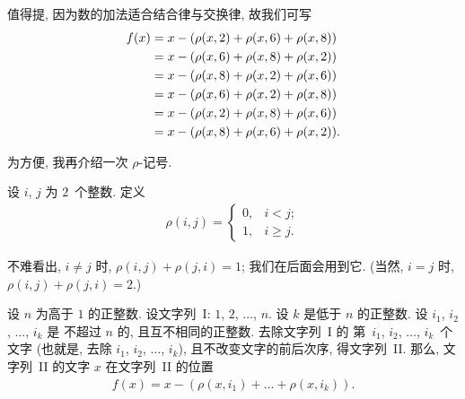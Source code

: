 \documentclass[../libro.tex]{subfiles}
\begin{document}
\begin{example}
    值得提,
    因为数的加法适合结合律与交换律,
    故我们可写
    \begin{align*}
        f(x)
        = {} & x - (\rho(x, 2) + \rho(x, 6) + \rho(x, 8))  \\
        = {} & x - (\rho(x, 6) + \rho(x, 8) + \rho(x, 2))  \\
        = {} & x - (\rho(x, 8) + \rho(x, 2) + \rho(x, 6))  \\
        = {} & x - (\rho(x, 6) + \rho(x, 2) + \rho(x, 8))  \\
        = {} & x - (\rho(x, 2) + \rho(x, 8) + \rho(x, 6))  \\
        = {} & x - (\rho(x, 8) + \rho(x, 6) + \rho(x, 2)).
        \qedhere
    \end{align*}
\end{example}

为方便, 我再介绍一次 \(\rho\)-记号.

\begin{definition}[\(\rho\)-记号]
    设 \(i\), \(j\) 为 \(2\)~个整数.
    定义
    \begin{align*}
        \rho(i, j) =
        \begin{cases}
            0, & i < j;    \\
            1, & i \geq j.
        \end{cases}
    \end{align*}
\end{definition}

不难看出, \(i \neq j\) 时,
\(\rho(i, j) + \rho(j, i) = 1\);
我们在后面会用到它.
(当然, \(i = j\) 时, \(\rho(i, j) + \rho(j, i) = 2\).)

\begin{theorem}[缺项定位]
    设 \(n\) 为高于 \(1\) 的正整数.
    设文字列~I: \(1\), \(2\), \(\dots\), \(n\).
    设 \(k\) 是低于 \(n\) 的正整数.
    设 \(i_1\), \(i_2\), \(\dots\), \(i_k\) 是%
    不超过 \(n\) 的, 且互不相同的正整数.
    去除文字列~I 的%
    第~\(i_1\), \(i_2\), \(\dots\), \(i_k\)~个文字
    (也就是, 去除 \(i_1\), \(i_2\), \(\dots\), \(i_k\)),
    且不改变文字的前后次序,
    得文字列~II.
    那么,
    文字列~II 的文字 \(x\)
    在文字列~II 的位置
    \begin{align*}
        f(x) = x - (\rho(x, i_1) + \dots + \rho(x, i_k)).
    \end{align*}
\end{theorem}
\end{document}
